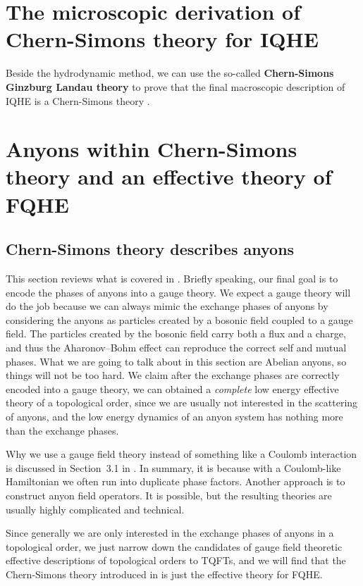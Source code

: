 \documentclass[hyperref, a4paper]{article}
\newcommand*{\concept}[1]{{\textbf{#1}}}
\begin{document}
\section{The microscopic derivation of Chern-Simons theory for IQHE}

Beside the hydrodynamic method, we can use the so-called \concept{Chern-Simons Ginzburg Landau theory} to 
prove that the final macroscopic description of IQHE is a Chern-Simons theory \cite{zhang_1992}.

\section{Anyons within Chern-Simons theory and an effective theory of FQHE}

\subsection{Chern-Simons theory describes anyons}

This section reviews what is covered in \cite{viefers_anyons}.
Briefly speaking, our final goal is to encode the phases of anyons into a gauge theory.
We expect a gauge theory will do the job because we can always mimic the exchange phases of anyons 
by considering the anyons as particles created by a bosonic field coupled to a gauge field.
The particles created by the bosonic field carry both a flux and a charge, 
and thus the Aharonov–Bohm effect can reproduce the correct self and mutual phases. 
What we are going to talk about in this section are Abelian anyons, so things will not be too hard.
We claim after the exchange phases are correctly encoded into a gauge theory, 
we can obtained a \emph{complete} low energy effective theory of a topological order,
since we are usually not interested in the scattering of anyons, and the low energy dynamics of an 
anyon system has nothing more than the exchange phases.

Why we use a gauge field theory instead of something like a Coulomb interaction is discussed in Section~3.1
in \cite{viefers_anyons}. In summary, it is because with a Coulomb-like Hamiltonian we often run into 
duplicate phase factors. Another approach is to construct anyon field operators. It is possible, but 
the resulting theories are usually highly complicated and technical.  

Since generally we are only interested in the exchange phases of anyons in a topological order, we just 
narrow down the candidates of gauge field theoretic effective descriptions of topological orders to TQFTs, 
and we will find that the Chern-Simons theory introduced in  is just the effective 
theory for FQHE. 
\end{document}
